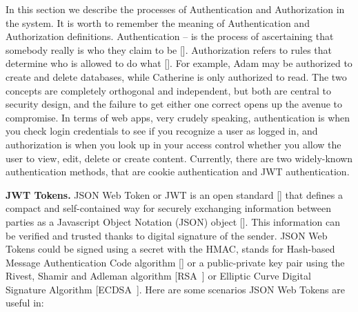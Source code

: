 In this section we describe the processes of Authentication and Authorization in the system.
It is worth to remember the meaning of Authentication and Authorization definitions.
Authentication -- is the process of ascertaining that somebody really is who they claim to be [\cite{burrows1989logic}].
Authorization refers to rules that determine who is allowed to do what [\cite{fagin1978authorization}].
For example, Adam may be authorized to create and delete databases, while Catherine is only authorized to read.
The two concepts are completely orthogonal and independent, but both are central to security design, and the
failure to get either one correct opens up the avenue to compromise.
In terms of web apps, very crudely speaking, authentication is when you check login credentials to see if you recognize
a user as logged in, and authorization is when you look up in your access control whether you allow the user to view,
edit, delete or create content.
Currently, there are two widely-known authentication methods, that are cookie authentication and JWT authentication.

\textbf{JWT Tokens.}
JSON Web Token or JWT is an open standard [\cite{jones2015rfc}] that defines a compact and self-contained way for securely
exchanging information between parties as a Javascript Object Notation (JSON) object [\cite{jones2015json}].
This information can be verified and trusted thanks to digital signature of the sender.
JSON Web Tokens could be signed using a secret with the HMAC,
stands for Hash-based Message Authentication Code algorithm [\cite{wang2004hmac}] or a public-private key pair using
the Rivest, Shamir and Adleman algorithm [RSA~\cite{wiener1990cryptanalysis}] or Elliptic Curve Digital Signature Algorithm
[ECDSA~\cite{johnson2001elliptic}].
Here are some scenarios JSON Web Tokens are useful in:

